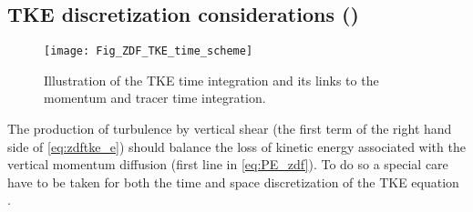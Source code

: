\documentclass[../tex_main/NEMO_manual]{subfiles}
\begin{document}
\subsection{TKE discretization considerations (\protect{})}
\label{subsec:ZDF_tke_ene}

\begin{figure}[!t]   \begin{center}
\texttt{[image: Fig\_ZDF\_TKE\_time\_scheme]}
\caption{ \protect\label{fig:TKE_time_scheme} 
Illustration of the TKE time integration and its links to the momentum and tracer time integration. }
\end{center}  
\end{figure}

The production of turbulence by vertical shear (the first term of the right hand side of
\autoref{eq:zdftke_e}) should balance the loss of kinetic energy associated with the vertical momentum diffusion
(first line in \autoref{eq:PE_zdf}).
To do so a special care have to be taken for both the time and space discretization of
the TKE equation \citep{Burchard_OM02,Marsaleix_al_OM08}.
\end{document}
